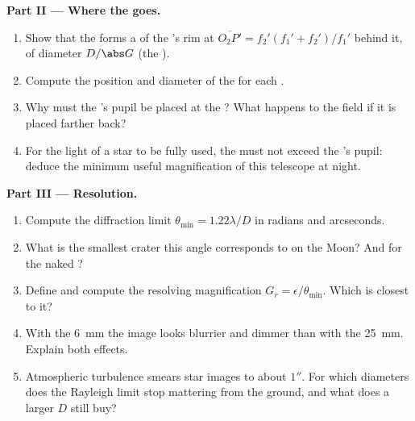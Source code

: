 \begin{problem}
\medskip
\noindent\textbf{Part II --- Where the  goes.}
\begin{enumerate}[resume]
  \item Show that the  forms a  of the 's rim
        at $\overline{O_2P'} = f_2'(f_1' + f_2')/f_1'$ behind it, of
        diameter $D/\abs G$ (the ).
  \item Compute the position and diameter of the  for each
        .
  \item Why must the 's pupil be placed at the ? What
        happens to the field if it is placed farther back?
  \item For the light of a star to be fully used, the  must
        not exceed the 's pupil: deduce the minimum useful
        magnification of this telescope at night.
\end{enumerate}

\medskip
\noindent\textbf{Part III --- Resolution.}
\begin{enumerate}[resume]
  \item Compute the diffraction limit $\theta_{\min} = 1.22\lambda/D$
        in radians and arcseconds.
  \item What is the smallest crater this angle corresponds to on the
        Moon? And for the naked ?
  \item Define and compute the resolving magnification $G_r =
        \epsilon/\theta_{\min}$. Which  is closest to it?
  \item With the \qty{6}{mm}  the image looks blurrier and
        dimmer than with the \qty{25}{mm}. Explain both effects.
  \item Atmospheric turbulence smears star images to about $1''$. For
        which  diameters does the Rayleigh limit stop
        mattering from the ground, and what does a larger $D$ still buy?
\end{enumerate}


\end{problem}
